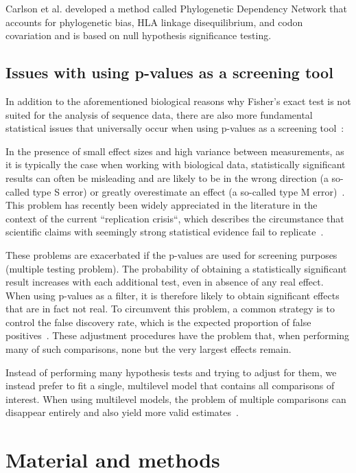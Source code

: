 \documentclass[fleqn,11pt]{SelfArx} %
\begin{document}
Carlson et al. \nolinebreak\cite{Carlson2008} developed a method called  Phylogenetic Dependency Network that accounts for phylogenetic bias,  HLA linkage disequilibrium, and codon covariation and is based on null hypothesis significance testing.

\subsection{Issues with using p-values as a screening tool}

In addition to the aforementioned biological reasons why Fisher's exact test is  not suited for the analysis of sequence data, there are also more fundamental statistical issues that universally occur when using p-values as a screening tool~\cite{Amrhein2017}:

In the presence of small effect sizes and high variance between measurements, as  it is typically the case when working with biological data, statistically significant results can often be misleading and are likely to be in the wrong direction (a so-called type S error) or greatly overestimate an effect (a so-called type M error)~\cite{Gelman2014}. This problem has recently been widely appreciated in the literature in the context of the current “replication crisis“, which describes the circumstance that scientific claims with seemingly strong statistical evidence fail to replicate~\cite{Ioannidis2005}.

These problems are exacerbated if the p-values are used for screening purposes (multiple testing problem). The probability  of  obtaining a statistically significant result increases with each additional test, even in absence of any real effect. When using p-values as a filter, it is therefore likely to obtain significant effects that are in fact not real. To circumvent this problem, a common strategy is to control the false discovery rate, which is the expected proportion of false positives~\cite{Benjamini1995}. These adjustment procedures have the problem that, when performing many of such comparisons, none but the very largest effects remain.

Instead of performing many hypothesis tests and trying to adjust for them, we instead prefer to fit a single, multilevel model that contains all comparisons of interest. When using multilevel models, the problem of multiple comparisons can disappear entirely and  also yield more valid estimates~\cite{Gelman2012}.

\section{Material and methods}
\end{document}
